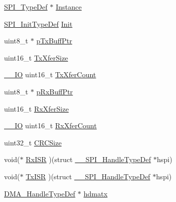 \begin{DoxyCompactItemize}
\item 
\hyperlink{struct_s_p_i___type_def}{S\+P\+I\+\_\+\+Type\+Def} $\ast$ \hyperlink{struct_____s_p_i___handle_type_def_aa5c715deaf693cc2dbfa90f40681ee1d}{Instance}
\item 
\hyperlink{struct_s_p_i___init_type_def}{S\+P\+I\+\_\+\+Init\+Type\+Def} \hyperlink{struct_____s_p_i___handle_type_def_a33f0dc84acb181a4702b30c92f007ca6}{Init}
\item 
uint8\+\_\+t $\ast$ \hyperlink{struct_____s_p_i___handle_type_def_a5cc31f7c52dafd32f27f8f2756dbf343}{p\+Tx\+Buff\+Ptr}
\item 
uint16\+\_\+t \hyperlink{struct_____s_p_i___handle_type_def_a80907b65d6f9541bc0dee444d16bc45b}{Tx\+Xfer\+Size}
\item 
\hyperlink{core__sc300_8h_aec43007d9998a0a0e01faede4133d6be}{\+\_\+\+\_\+\+IO} uint16\+\_\+t \hyperlink{struct_____s_p_i___handle_type_def_a1823437fbed80bdd1510782ced4e5532}{Tx\+Xfer\+Count}
\item 
uint8\+\_\+t $\ast$ \hyperlink{struct_____s_p_i___handle_type_def_a7cee540cb21048ac48ba17355440e668}{p\+Rx\+Buff\+Ptr}
\item 
uint16\+\_\+t \hyperlink{struct_____s_p_i___handle_type_def_ac12f5f1f6295b3c3327d5feabf5a96fb}{Rx\+Xfer\+Size}
\item 
\hyperlink{core__sc300_8h_aec43007d9998a0a0e01faede4133d6be}{\+\_\+\+\_\+\+IO} uint16\+\_\+t \hyperlink{struct_____s_p_i___handle_type_def_ad95a26d6b12b7087bba3d1b769175db2}{Rx\+Xfer\+Count}
\item 
uint32\+\_\+t \hyperlink{struct_____s_p_i___handle_type_def_a752c564d700e8da6d94c705629d204aa}{C\+R\+C\+Size}
\item 
void($\ast$ \hyperlink{struct_____s_p_i___handle_type_def_ae69a57c50a44075680eb48ba13e41bf3}{Rx\+I\+SR} )(struct \hyperlink{struct_____s_p_i___handle_type_def}{\+\_\+\+\_\+\+S\+P\+I\+\_\+\+Handle\+Type\+Def} $\ast$hspi)
\item 
void($\ast$ \hyperlink{struct_____s_p_i___handle_type_def_a445355c8080382b2d33c690e1790585f}{Tx\+I\+SR} )(struct \hyperlink{struct_____s_p_i___handle_type_def}{\+\_\+\+\_\+\+S\+P\+I\+\_\+\+Handle\+Type\+Def} $\ast$hspi)
\item 
\hyperlink{group___d_m_a___exported___types_ga92b907d56a9c29b93d46782a7a04f91e}{D\+M\+A\+\_\+\+Handle\+Type\+Def} $\ast$ \hyperlink{struct_____s_p_i___handle_type_def_a33e13c28b1a70e6164417abb026d7a22}{hdmatx}
\item 

\end{DoxyCompactItemize}

